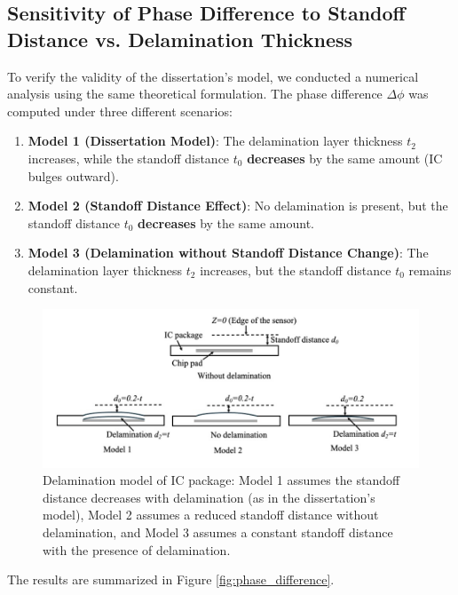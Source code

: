 \documentclass[10pt,twocolumn]{article}
\begin{document}
\subsection{Sensitivity of Phase Difference to Standoff Distance vs. Delamination Thickness}

To verify the validity of the dissertation’s model, we conducted a numerical analysis using the same theoretical formulation. The phase difference \( \Delta \phi \) was computed under three different scenarios:

\begin{enumerate}
    \item \textbf{Model 1 (Dissertation Model)}: The delamination layer thickness \( t_2 \) increases, while the standoff distance \( t_0 \) \textbf{decreases} by the same amount (IC bulges outward).
    \item \textbf{Model 2 (Standoff Distance Effect)}: No delamination is present, but the standoff distance \( t_0 \) \textbf{decreases} by the same amount.
    \item \textbf{Model 3 (Delamination without Standoff Distance Change)}: The delamination layer thickness \( t_2 \) increases, but the standoff distance \( t_0 \) remains constant.
\end{enumerate}

\begin{figure}[ht]
    \centering
    \includegraphics[width=0.8\linewidth]{Fig1.jpg}
    \caption{Delamination model of IC package: Model 1 assumes the standoff distance decreases with delamination (as in the dissertation's model), Model 2 assumes a reduced standoff distance without delamination, and Model 3 assumes a constant standoff distance with the presence of delamination.}
    \label{fig:delamination_model}
\end{figure}

The results are summarized in Figure 
\ref{fig:phase_difference}.
\end{document}
